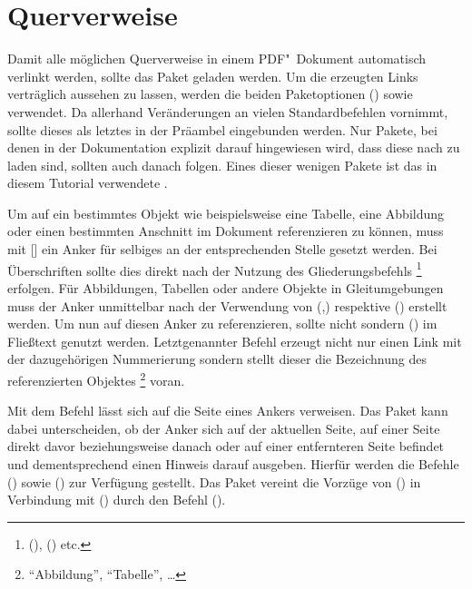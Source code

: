 \documentclass[%
  english,ngerman,%
  cdgeometry=no,DIV=12,automark%
]{tudscrartcl}
\begin{document}
\section{Querverweise}
\label{sec:references}%
%
Damit alle möglichen Querverweise in einem PDF"~Dokument automatisch verlinkt 
werden, sollte das Paket  geladen werden. Um die erzeugten 
Links verträglich aussehen zu lassen, werden die beiden Paketoptionen 
() sowie  
verwendet. Da  allerhand Veränderungen an vielen 
Standardbefehlen vornimmt, sollte dieses als letztes in der Präambel 
eingebunden werden. Nur Pakete, bei denen in der Dokumentation explizit darauf 
hingewiesen wird, dass diese nach  zu laden sind, sollten 
auch danach folgen. Eines dieser wenigen Pakete ist das in diesem Tutorial 
verwendete . 
%
\begin{Hint}
\usepackage[colorlinks,linkcolor=blue]{hyperref}

\end{Hint}
%
Um auf ein bestimmtes Objekt wie beispielsweise eine Tabelle, eine Abbildung 
oder einen bestimmten Anschnitt im Dokument referenzieren zu können, muss mit 
[] ein Anker für selbiges an der entsprechenden 
Stelle gesetzt werden. Bei Überschriften sollte dies direkt nach der Nutzung 
des Gliederungsbefehls%
\footnote{%
  (), 
  () etc.%
}
erfolgen. Für Abbildungen, Tabellen oder andere Objekte in Gleitumgebungen muss 
der Anker unmittelbar nach der Verwendung von 
(,) respektive 
() erstellt werden. Um nun auf diesen 
Anker zu referenzieren, sollte nicht  sondern 
() im Fließtext genutzt werden. Letztgenannter 
Befehl erzeugt nicht nur einen Link mit der dazugehörigen Nummerierung sondern 
stellt dieser die Bezeichnung des referenzierten Objektes%
\footnote{\enquote{Abbildung}, \enquote{Tabelle}, \dots}
voran. 

Mit dem Befehl  lässt sich auf die Seite eines Ankers verweisen. 
Das Paket  kann dabei unterscheiden, ob der Anker sich auf 
der aktuellen Seite, auf einer Seite direkt davor beziehungsweise danach oder 
auf einer entfernteren Seite befindet und dementsprechend einen Hinweis darauf 
ausgeben. Hierfür werden die Befehle () sowie 
() zur Verfügung gestellt. Das Paket 
 vereint die Vorzüge von () 
in Verbindung mit () durch den Befehl 
().
\end{document}
